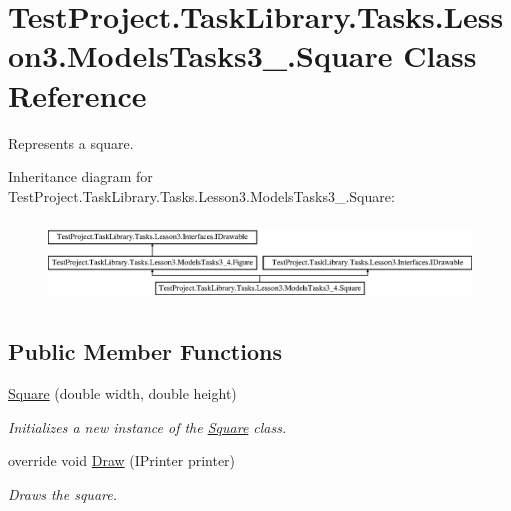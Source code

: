 \hypertarget{class_test_project_1_1_task_library_1_1_tasks_1_1_lesson3_1_1_models_tasks3__4_1_1_square}{}\section{Test\+Project.\+Task\+Library.\+Tasks.\+Lesson3.\+Models\+Tasks3\+\_.\+Square Class Reference}
\label{class_test_project_1_1_task_library_1_1_tasks_1_1_lesson3_1_1_models_tasks3__4_1_1_square}


Represents a square.  


Inheritance diagram for Test\+Project.\+Task\+Library.\+Tasks.\+Lesson3.\+Models\+Tasks3\+\_.\+Square\+:\begin{figure}[H]
\begin{center}
\leavevmode
\includegraphics[height=2.193212cm]{class_test_project_1_1_task_library_1_1_tasks_1_1_lesson3_1_1_models_tasks3__4_1_1_square}
\end{center}
\end{figure}
\subsection*{Public Member Functions}
\begin{DoxyCompactItemize}
\item 
\mbox{\hyperlink{class_test_project_1_1_task_library_1_1_tasks_1_1_lesson3_1_1_models_tasks3__4_1_1_square_a30a3191f966e78a81fccedfedb468d50}{Square}} (double width, double height)
\begin{DoxyCompactList}\small\item\em Initializes a new instance of the \mbox{\hyperlink{class_test_project_1_1_task_library_1_1_tasks_1_1_lesson3_1_1_models_tasks3__4_1_1_square}{Square}} class. \end{DoxyCompactList}\item 
override void \mbox{\hyperlink{class_test_project_1_1_task_library_1_1_tasks_1_1_lesson3_1_1_models_tasks3__4_1_1_square_a564aa1273ffb7fa43c6e5774c4702716}{Draw}} (I\+Printer printer)
\begin{DoxyCompactList}\small\item\em Draws the square. \end{DoxyCompactList}\end{DoxyCompactItemize}
